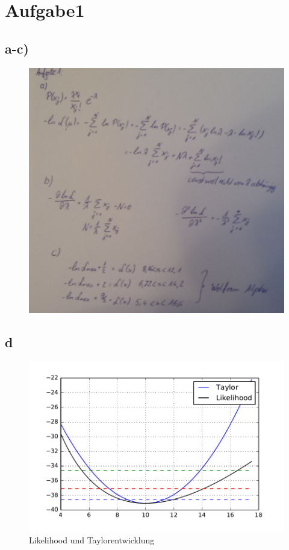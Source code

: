\section*{Aufgabe1}
\subsection*{a-c)}
\begin{figure}[H]
  \centering
  \includegraphics[width=\textwidth]{./Task_1.jpg}
\end{figure}
\subsection*{d}
\begin{figure}
  \centering
  \includegraphics[width=\textwidth]{./Python/TaskA.pdf}
  \caption{Likelihood und Taylorentwicklung}
\end{figure}
